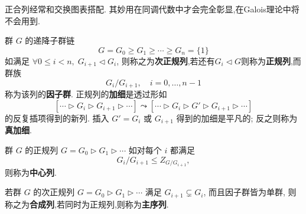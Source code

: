 正合列经常和交换图表搭配. 其妙用在同调代数中才会完全彰显,在Galois理论中将不会用到.
\begin{definition}\label{def:normal-series}
	群 $G$ 的递降子群链
	\[ G = G_0 \geqslant G_1 \geqslant \cdots \geqslant G_n = \{1\} \]
	如满足 $\forall 0 \leq i < n,\;  G_{i+1} \lhd G_i$, 则称之为\textbf{次正规列},若还有$G_i \lhd G$则称为\textbf{正规列},而群族
	\[ G_i/G_{i+1}, \quad i=0, \ldots, n-1 \]
	称为该列的\textbf{因子群}. 正规列的\textbf{加细}是透过形如 
	\[ \left[ \cdots \rhd G_i \rhd G_{i+1} \rhd \cdots \right] \leadsto \left[ \cdots \rhd G_i \rhd G' \rhd G_{i+1} \rhd \cdots \right] \]
	的反复插项得到的新列. 插入 $G' = G_i$ 或 $G_{i+1}$ 得到的加细是平凡的; 反之则称为\textbf{真加细}.
\end{definition}
\begin{definition}\label{def:central-series}
	群 $G$ 的正规列 $G = G_0 \rhd G_1 \rhd \cdots$ 如对每个 $i$ 都满足
	\[
	G_i/G_{i+1} \leqslant Z_{G/G_{i+1}},
	\]
	则称为\textbf{中心列}.
\end{definition}
\begin{definition}\label{def:composition-series}
	若群 $G$ 的次正规列 $G = G_0 \rhd G_1 \rhd \cdots$ 满足 $G_{i+1} \subsetneq G_i$, 而且因子群皆为单群, 则称之为\textbf{合成列},若同时为正规列,则称为\textbf{主序列}.
\end{definition}

